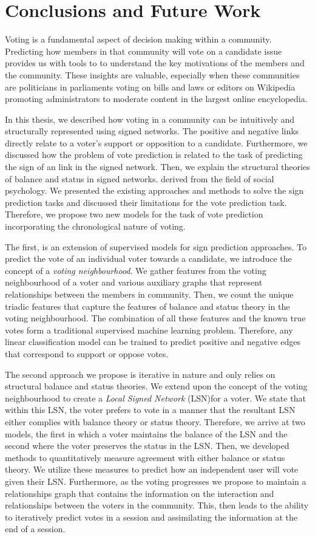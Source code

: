\chapter{Conclusions and Future Work}
\label{chp:conclusion}
Voting is a fundamental aspect of decision making within a community.
Predicting how members in that community will vote on a candidate issue provides us with tools to to understand the key motivations of the members and the community.
These insights are valuable, especially when these communities are politicians in parliaments voting on bills and laws or editors on Wikipedia promoting administrators to moderate content in the largest online encyclopedia.

In this thesis, we described how voting in a community can be intuitively and structurally represented using signed networks.
The positive and negative links directly relate to a voter's support or opposition to a candidate.
Furthermore, we discussed how the problem of vote prediction is related to the task of predicting the sign of an link in the signed network.
Then, we explain the structural theories of balance and status in signed networks. derived from the field of social psychology.
We presented the existing approaches and methods to solve the sign prediction tasks and discussed their limitations for the vote prediction task.
Therefore, we propose two new models for the task of vote prediction incorporating the chronological nature of voting.

The first, is an extension of supervised models for sign prediction approaches.
To predict the vote of an individual voter towards a candidate, we introduce the concept of a \textit{voting neighbourhood}.
We gather features from the voting neighbourhood of a voter and various auxiliary graphs that represent relationships between the members in community.
Then, we count the unique triadic features that capture the features of balance and status theory in the voting neighbourhood.
The combination of all these features and the known true votes form a traditional supervised machine learning problem.
Therefore, any linear classification model can be trained to predict positive and negative edges that correspond to support or oppose votes.

The second approach we propose is iterative in nature and only relies on structural balance and status theories.
We extend upon the concept of the voting neighbourhood to create a \textit{Local Signed Network} (LSN)for a voter.
We state that within this LSN, the voter prefers to vote in a manner that the resultant LSN either complies with balance theory or status theory.
Therefore, we arrive at two models, the first in which a voter maintains the balance of the LSN and the second where the voter preserves the status in the LSN.
Then, we developed methods to quantitatively measure agreement with either balance or status theory.
We utilize these measures to predict how an independent user will vote given their LSN.
Furthermore, as the voting progresses we propose to maintain a relationships graph that contains the information on the interaction and relationships between the voters in the community.
This, then leads to the ability to iteratively predict votes in a session and assimilating the information at the end of a session.

